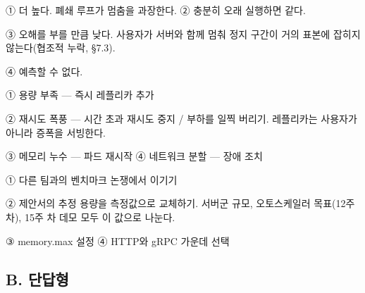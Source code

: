\begin{tbboptions}
  \item ① 더 높다. 폐쇄 루프가 멈춤을 과장한다.        ② 충분히 오래 실행하면 같다.
  \item ③ 오해를 부를 만큼 낮다. 사용자가 서버와 함께 멈춰 정지 구간이 거의 표본에 잡히지 않는다(협조적 누락, §7.3).
  \item ④ 예측할 수 없다.
\end{tbboptions}


\begin{tbboptions}
  \item ① 용량 부족 — 즉시 레플리카 추가
  \item ② 재시도 폭풍 — 시간 초과 재시도 중지 / 부하를 일찍 버리기. 레플리카는 사용자가 아니라 증폭을 서빙한다.
  \item ③ 메모리 누수 — 파드 재시작        ④ 네트워크 분할 — 장애 조치
\end{tbboptions}


\begin{tbboptions}
  \item ① 다른 팀과의 벤치마크 논쟁에서 이기기
  \item ② 제안서의 추정 용량을 측정값으로 교체하기. 서버군 규모, 오토스케일러 목표(12주 차), 15주 차 데모 모두 이 값으로 나눈다.
  \item ③ memory.max 설정        ④ HTTP와 gRPC 가운데 선택
\end{tbboptions}

\subsection*{B. 단답형}




